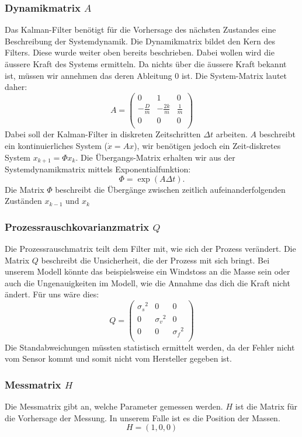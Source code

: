\subsubsection*{Dynamikmatrix $A$}
Das Kalman-Filter benötigt für die Vorhersage des nächsten Zustandes eine Beschreibung der Systemdynamik.
Die Dynamikmatrix bildet den Kern des Filters. Diese wurde weiter oben bereits beschrieben. 
Dabei wollen wird die äussere Kraft des Systems ermitteln.
Da nichts über die äussere Kraft bekannt ist, müssen wir annehmen das deren Ableitung 0 ist. 
Die System-Matrix lautet daher:
\[ 
A = \left(
 \begin{array}{ccc} 	
0 & 1& 0 \\
- \frac{D}{m} &-\frac{2k}{m} & \frac{1} {m}\\
0 & 0& 0\\ 
\end{array}\right)  
 \]
Dabei soll der Kalman-Filter in diskreten Zeitschritten $\Delta t$ arbeiten. 
$A$ beschreibt ein kontinuierliches System ($\dot x = Ax$), wir benötigen jedoch ein Zeit-diskretes System $x_{k+1} = \Phi x_k$.
Die Übergangs-Matrix erhalten wir aus der Systemdynamikmatrix mittels Exponentialfunktion: 
\[\Phi = \exp(A\Delta t). \]
Die Matrix $\Phi$ beschreibt die Übergänge zwischen zeitlich aufeinanderfolgenden Zuständen $x_{k-1}$ und $x_{k}$

\subsubsection*{Prozessrauschkovarianzmatrix $Q$}
Die Prozessrauschmatrix teilt dem Filter mit, wie sich der Prozess verändert. 
Die Matrix $Q$ beschreibt die Unsicherheit, die der Prozess mit sich bringt. 
Bei unserem Modell könnte das beispielsweise ein Windstoss an die Masse sein oder auch die Ungenauigkeiten im Modell, wie die Annahme das dich die Kraft nicht ändert.
Für uns wäre dies:
\[ 
Q = \left(
 \begin{array}{ccc} 	
{\sigma_s }^2& 0& 0 \\ 
0 & {\sigma_v }^2& 0\\ 
0 & 0& {\sigma_f }^2\\
\end{array}\right)  
 \]
Die Standabweichungen müssten statistisch ermittelt werden, da der Fehler nicht vom Sensor kommt und somit nicht vom Hersteller gegeben ist. 

\subsubsection*{Messmatrix $H$}
Die Messmatrix gibt an, welche Parameter gemessen werden. 
$H$ ist die Matrix für die Vorhersage der Messung.
In unserem Falle ist es die Position der Massen. 
\[ 
H = (1, 0, 0) 
\]

